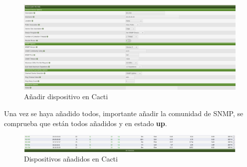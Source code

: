 \documentclass[11pt]{article}
\begin{document}
\begin{figure}[h]
    \centering
    \includegraphics[width=\textwidth]{src/adddevices.png}
    \caption{Añadir dispositivo en Cacti}
\end{figure}

Una vez se haya añadido todos, importante añadir la comunidad de SNMP, se comprueba que están todos añadidos y en estado \textbf{up}.

\begin{figure}[h]
    \centering
    \includegraphics[width=\textwidth]{src/devices.png}
    \caption{Dispositivos añadidos en Cacti}
\end{figure}
\end{document}
